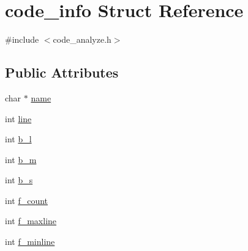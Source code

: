 \hypertarget{structcode__info}{\section{code\+\_\+info Struct Reference}
\label{structcode__info}
}


{\ttfamily \#include $<$code\+\_\+analyze.\+h$>$}

\subsection*{Public Attributes}
\begin{DoxyCompactItemize}
\item 
char $\ast$ \hyperlink{structcode__info_ab511aa50afcbcfc1bb2fa4b4a6012e6b}{name}
\item 
int \hyperlink{structcode__info_ad2648840a6e7ba7c9c02ec444a3adac2}{line}
\item 
int \hyperlink{structcode__info_a06f6c405ef67eb10711dc4fbc90e52c2}{b\+\_\+l}
\item 
int \hyperlink{structcode__info_a4dc2ea78ef6f9f8f1fea89fd42f7bf18}{b\+\_\+m}
\item 
int \hyperlink{structcode__info_a881e5abdce42a2de03dd079ee7ae3304}{b\+\_\+s}
\item 
int \hyperlink{structcode__info_a091007c87af472a025bc06633218e344}{f\+\_\+count}
\item 
int \hyperlink{structcode__info_a8a9fc76d0701714e834a52a66b82156e}{f\+\_\+maxline}
\item 
int \hyperlink{structcode__info_ac0a3b579d41a998a2aec410925032aa7}{f\+\_\+minline}
\end{DoxyCompactItemize}


